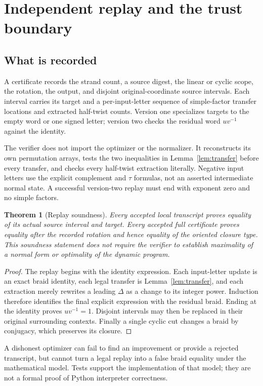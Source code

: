 \documentclass[11pt,a4paper]{article}
\newtheorem{theorem}{Theorem}[section]
\theoremstyle{definition}\newtheorem{definition}[theorem]{Definition}
\theoremstyle{remark}\newtheorem{remark}[theorem]{Remark}
\begin{document}
\section{Independent replay and the trust boundary}

\subsection{What is recorded}
A certificate records the strand count, a source digest, the linear or cyclic
scope, the rotation, the output, and disjoint original-coordinate source
intervals. Each interval carries its target and a per-input-letter sequence
of simple-factor transfer locations and extracted half-twist counts.
Version one specializes targets to the empty word or one signed letter;
version two checks the residual word $uv^{-1}$ against the identity.

The verifier does not import the optimizer or the normalizer. It reconstructs
its own permutation arrays, tests the two inequalities in
Lemma~\ref{lem:transfer} before every transfer, and checks every half-twist
extraction literally. Negative input letters use the explicit complement
and $\tau$ formulas, not an asserted intermediate normal state. A successful
version-two replay must end with exponent zero and no simple factors.

\begin{theorem}[Replay soundness]\label{thm:replay}
Every accepted local transcript proves equality of its actual source
interval and target. Every accepted full certificate proves equality after
the recorded rotation and hence equality of the oriented closure type.
This soundness statement does not require the verifier to establish
maximality of a normal form or optimality of the dynamic program.
\end{theorem}
\begin{proof}
The replay begins with the identity expression. Each input-letter update
is an exact braid identity, each legal transfer is
Lemma~\ref{lem:transfer}, and each extraction merely rewrites a leading
$\Delta$ as a change to its integer power. Induction therefore identifies
the final explicit expression with the residual braid. Ending at the
identity proves $uv^{-1}=1$. Disjoint intervals may then be replaced in
their original surrounding contexts. Finally a single cyclic cut changes
a braid by conjugacy, which preserves its closure.
\end{proof}

A dishonest optimizer can fail to find an improvement or provide a rejected
transcript, but cannot turn a legal replay into a false braid equality under
the mathematical model. Tests support the implementation of that model;
they are not a formal proof of Python interpreter correctness.
\end{document}
